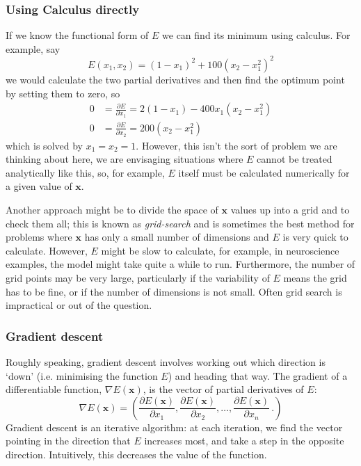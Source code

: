 \documentclass[12pt]{article}
\begin{document}
\subsubsection*{Using Calculus directly}
If we know the functional form of $E$ we can find its minimum
using calculus. For example, say
\begin{equation}
E(x_1,x_2)=(1-x_1)^2+100(x_2-x_1^2)^2
\end{equation}
we would calculate the two partial derivatives and then find the
optimum point by setting them to zero, so
\begin{equation}
\begin{aligned}
0&=\frac{\partial E}{\partial x_1}=2(1-x_1)-400x_1(x_2-x_1^2)\\
0&=\frac{\partial E}{\partial x_2}=200(x_2-x_1^2)
\end{aligned}
\end{equation}
which is solved by $x_1=x_2=1$. However, this isn't the sort of
problem we are thinking about here, we are envisaging situations where
$E$ cannot be treated analytically like this, so, for example, $E$
itself must be calculated numerically for a given value of
$\mathbf{x}$.


Another approach might be to divide the space of $\mathbf{x}$ values
up into a grid and to check them all; this is known as \emph{grid-search} and
is sometimes the best method for problems where $\mathbf{x}$ has only
a small number of dimensions and $E$ is very quick to
calculate. However, $E$ might be slow to calculate, for example, in
neuroscience examples, the model might take quite a while to
run. Furthermore, the number of grid points may be very large,
particularly if the variability of $E$ means the grid has to be fine,
or if the number of dimensions is not small. Often grid search is
impractical or out of the question.

\subsubsection*{Gradient descent}
Roughly speaking, gradient descent involves working out which direction is `down' (i.e. minimising the function $E$) and heading that way.
The gradient of a differentiable function, $\nabla E(\mathbf{x})$, is the vector of partial derivatives of $E$:
\begin{equation}
    \nabla E(\mathbf{x}) = \left( \frac{\partial E(\mathbf{x})}{\partial x_1}, \frac{\partial E(\mathbf{x})}{\partial x_2}, \dots, \frac{\partial E(\mathbf{x})}{\partial x_n}\,.
    \right)
\end{equation}
Gradient descent is an iterative algorithm: at each iteration, we find the vector pointing in the direction that $E$ increases most, and take a step in the opposite direction. Intuitively, this decreases the value of the function. 
\end{document}
